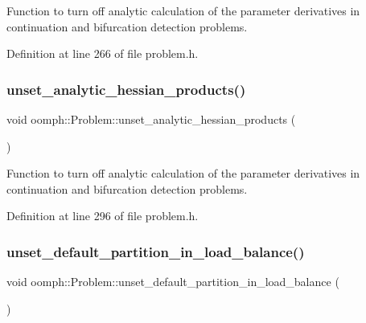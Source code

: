 Function to turn off analytic calculation of the parameter derivatives in continuation and bifurcation detection problems. 



Definition at line 266 of file problem.\+h.

\mbox{\label{classoomph_1_1Problem_accd672b3da8c5bf28ad6bd856e28d1cf}} 
\subsubsection{\texorpdfstring{unset\+\_\+analytic\+\_\+hessian\+\_\+products()}{unset\_analytic\_hessian\_products()}}
{\footnotesize\ttfamily void oomph\+::\+Problem\+::unset\+\_\+analytic\+\_\+hessian\+\_\+products (\begin{DoxyParamCaption}{ }\end{DoxyParamCaption})\hspace{0.3cm}{\ttfamily [inline]}}



Function to turn off analytic calculation of the parameter derivatives in continuation and bifurcation detection problems. 



Definition at line 296 of file problem.\+h.

\mbox{\label{classoomph_1_1Problem_a1157876a05d112d523be03d9c30464de}} 
\subsubsection{\texorpdfstring{unset\+\_\+default\+\_\+partition\+\_\+in\+\_\+load\+\_\+balance()}{unset\_default\_partition\_in\_load\_balance()}}
{\footnotesize\ttfamily void oomph\+::\+Problem\+::unset\+\_\+default\+\_\+partition\+\_\+in\+\_\+load\+\_\+balance (\begin{DoxyParamCaption}{ }\end{DoxyParamCaption})\hspace{0.3cm}{\ttfamily [inline]}}



